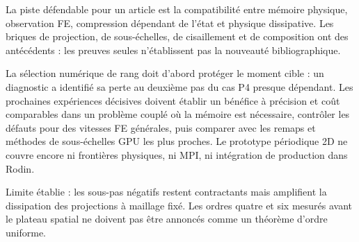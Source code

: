 \documentclass[10pt,a4paper]{article}
\begin{document}
La piste défendable pour un article est la compatibilité entre mémoire physique, observation FE, compression dépendant de l’état et physique dissipative. Les briques de projection, de sous-échelles, de cisaillement et de composition ont des antécédents : les preuves seules n’établissent pas la nouveauté bibliographique.

La sélection numérique de rang doit d’abord protéger le moment cible : un diagnostic a identifié sa perte au deuxième pas du cas P4 presque dépendant. Les prochaines expériences décisives doivent établir un bénéfice à précision et coût comparables dans un problème couplé où la mémoire est nécessaire, contrôler les défauts pour des vitesses FE générales, puis comparer avec les remaps et méthodes de sous-échelles GPU les plus proches. Le prototype périodique 2D ne couvre encore ni frontières physiques, ni MPI, ni intégration de production dans Rodin.

Limite établie : les sous-pas négatifs restent contractants mais amplifient la dissipation des projections à maillage fixé. Les ordres quatre et six mesurés avant le plateau spatial ne doivent pas être annoncés comme un théorème d’ordre uniforme.
\end{document}
